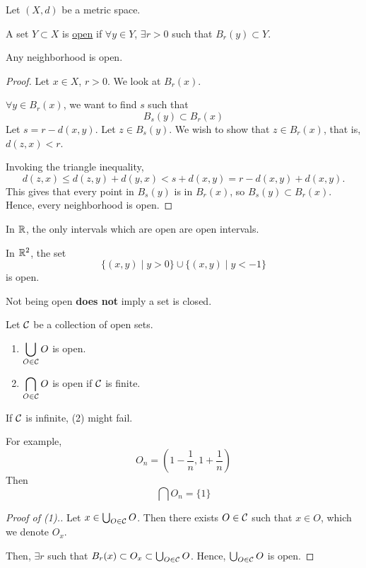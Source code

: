 Let $(X, d)$ be a metric space.
\begin{definition}
    A set $Y\subset X$ is \ul{open} if $\forall y\in Y$, $\exists r > 0$ such that $B_r(y)\subset Y$.
\end{definition}

\begin{proposition}
    Any neighborhood is open.
\end{proposition}
\begin{proof}
    Let $x\in X$, $r > 0$. We look at $B_r(x)$.

    $\forall y\in B_r(x)$, we want to find $s$ such that
    \[B_s(y) \subset B_r(x)\]
    Let $s = r - d(x, y)$. Let $z\in B_s(y)$. We wish to show that $z\in B_r(x)$, that is, $d(z, x) < r$.

    Invoking the triangle inequality,
    \[d(z, x) \leq d(z, y) + d(y, x) < s + d(x, y) = r - d(x, y) + d(x, y).\]
    This gives that every point in $B_s(y)$ is in $B_r(x)$, so $B_s(y)\subset B_r(x)$. Hence, every neighborhood is open.
\end{proof}
\begin{example}
    In $\mathbb R$, the only intervals which are open are open intervals.
\end{example}
\begin{example}
    In $\mathbb R^2$, the set
    \[\{(x, y)\mid y > 0\}\cup \{(x, y)\mid y < -1\}\]
    is open.
\end{example}
\begin{remark}
    Not being open \textbf{does not} imply a set is closed.
\end{remark}
\begin{proposition}
    Let $\mathcal C$ be a collection of open sets.
    \begin{enumerate}[(1)]
        \item $\displaystyle \bigcup_{O\in \mathcal C} O$ is open.
        \item $\displaystyle \bigcap_{O\in \mathcal C} O$ is open if $\mathcal C$ is finite.
    \end{enumerate}
    If $\mathcal C$ is infinite, (2) might fail.
\end{proposition}
\begin{example}
    For example,
    \[O_n = \left( 1 - \frac{1}{n}, 1 + \frac{1}{n} \right)\]
    Then
    \[\bigcap O_n = \{1\}\]
\end{example}
\begin{proof}[Proof of (1).]
    Let $x\in \bigcup_{O\in \mathcal C} O$. Then there exists $O\in \mathcal C$ such that $x\in O$, which we denote $O_x$.

    Then, $\exists r$ such that $B_r(x)\subset O_x \subset \bigcup_{O\in \mathcal C} O$. Hence, $\bigcup_{O\in \mathcal C} O$ is open.
\end{proof}

